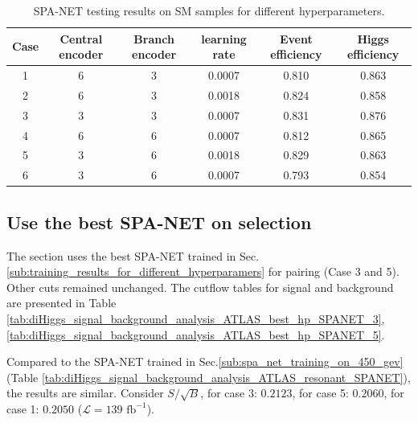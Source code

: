 \documentclass[12pt]{article}
\begin{document}
		\begin{table}[htpb]
			\centering
			\caption{SPA-NET testing results on SM samples for different hyperparameters.}
			\label{tab:SPANet_hp_50ep_test_SM}
			\begin{tabular}{c|ccc|cc}
			 Case & Central encoder & Branch encoder & learning rate & Event efficiency & Higgs efficiency \\
			 \hline
			 1&    6             &     3           &  0.0007             &   0.810               &    0.863          \\
			 2&    6             &     3           &  0.0018             &   0.824               &    0.858          \\
			 3&    3             &     3           &  0.0007             &   0.831               &    0.876          \\
			 4&    6             &     6           &  0.0007             &   0.812               &    0.865          \\
			 5&    3             &     6           &  0.0018             &   0.829               &    0.863			\\
			 6&    3             &     6           &  0.0007             &   0.793               &    0.854             
			\end{tabular}
		\end{table}

	\subsection{Use the best SPA-NET on selection}%
	\label{sub:use_the_best_spa_net_on_selection}
		The section uses the best SPA-NET trained in Sec.\ref{sub:training_results_for_different_hyperparamers} for pairing (Case 3 and 5). Other cuts remained unchanged. The cutflow tables for signal and background are presented in Table \ref{tab:diHiggs_signal_background_analysis_ATLAS_best_hp_SPANET_3}, \ref{tab:diHiggs_signal_background_analysis_ATLAS_best_hp_SPANET_5}.

		Compared to the SPA-NET trained in Sec.\ref{sub:spa_net_training_on_450_gev} (Table \ref{tab:diHiggs_signal_background_analysis_ATLAS_resonant_SPANET}), the results are similar. Consider $S/\sqrt{B}$, for case 3: $0.2123$, for case 5: $ 0.2060$, for case 1: $ 0.2050$ ($\mathcal{L} = 139 \text{ fb}^{-1}$). 
\end{document}
